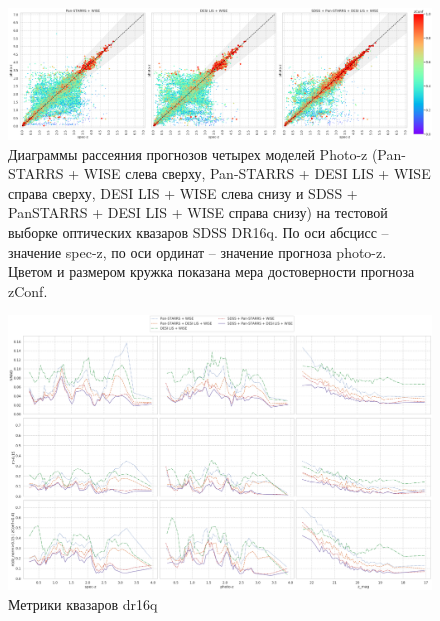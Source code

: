 \documentclass[fleqn,usenatbib]{mnras}
\begin{document}
\begin{figure}
    \centering
    \includegraphics[width=0.9\linewidth]{images/scatterplots-dr16q-wo-train.png}
    \caption{Диаграммы рассеяния прогнозов четырех моделей Photo-z (Pan-STARRS + WISE слева сверху, Pan-STARRS + DESI LIS + WISE справа сверху, DESI LIS + WISE слева снизу и SDSS + PanSTARRS + DESI LIS + WISE справа снизу) на тестовой выборке оптических квазаров SDSS DR16q. По оси абсцисс -- значение spec-z, по оси ординат -- значение прогноза photo-z. Цветом и размером кружка показана мера достоверности прогноза zConf.}
    \label{fig:dr16q_wo_train}
\end{figure}

\begin{figure}
    \centering
    \includegraphics[width=0.9\linewidth]{images/metrics-dr16q-ab.png}
    \caption{Метрики квазаров dr16q}
    \label{fig:metrics-cv2-gal}
\end{figure}
\end{document}
